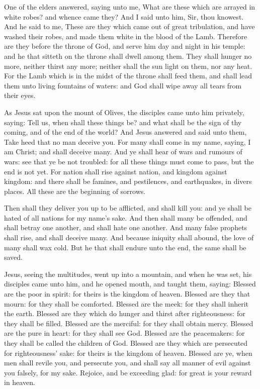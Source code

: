 \label{Revelation713}
 One of the elders answered, saying unto me, What are these which are arrayed in white robes? and whence came they? And I said unto him, Sir, thou knowest. And he said to me, These are they which came out of great tribulation, and have washed their robes, and made them white in the blood of the Lamb. Therefore are they before the throne of God, and serve him day and night in his temple: and he that sitteth on the throne shall dwell among them. They shall hunger no more, neither thirst any more; neither shall the sun light on them, nor any heat. For the Lamb which is in the midst of the throne shall feed them, and shall lead them unto living fountains of waters: and God shall wipe away all tears from their eyes.

\label{Matthew243}
 As Jesus sat upon the mount of Olives, the disciples came unto him privately, saying: Tell us, when shall these things be? and what shall be the sign of thy coming, and of the end of the world? And Jesus answered and said unto them, Take heed that no man deceive you. For many shall come in my name, saying, I am Christ; and shall deceive many. And ye shall hear of wars and rumours of wars: see that ye be not troubled: for all these things must come to pass, but the end is not yet. For nation shall rise against nation, and kingdom against kingdom: and there shall be famines, and pestilences, and earthquakes, in divers places. All these are the beginning of sorrows.

Then shall they deliver you up to be afflicted, and shall kill you: and ye shall be hated of all nations for my name’s sake. And then shall many be offended, and shall betray one another, and shall hate one another. And many false prophets shall rise, and shall deceive many. And because iniquity shall abound, the love of many shall wax cold. But he that shall endure unto the end, the same shall be saved.

 Jesus, seeing the multitudes, went up into a mountain, and when he was set, his disciples came unto him, and he opened mouth, and taught them, saying: Blessed are the poor in spirit: for theirs is the kingdom of heaven. Blessed are they that mourn: for they shall be comforted. Blessed are the meek: for they shall inherit the earth. Blessed are they which do hunger and thirst after righteousness: for they shall be filled. Blessed are the merciful: for they shall obtain mercy. Blessed are the pure in heart: for they shall see God. Blessed are the peacemakers: for they shall be called the children of God. Blessed are they which are persecuted for righteousness’ sake: for theirs is the kingdom of heaven. Blessed are ye, when men shall revile you, and persecute you, and shall say all manner of evil against you falsely, for my sake. Rejoice, and be exceeding glad: for great is your reward in heaven.

